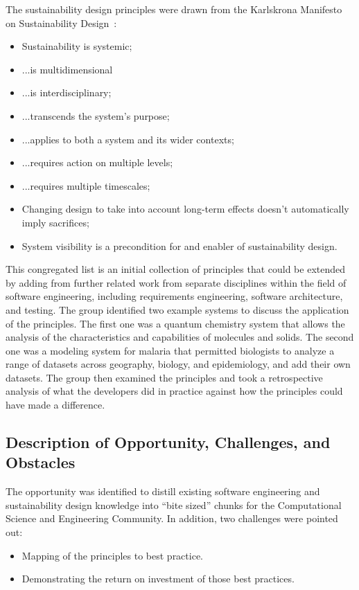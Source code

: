 The sustainability design principles were drawn from the Karlskrona Manifesto on Sustainability Design~\cite{karlskrona,becker2015}:
\begin{itemize}
\item Sustainability is systemic;
\item ...is multidimensional
\item ...is interdisciplinary;
\item ...transcends the system’s purpose;
\item ...applies to both a system and its wider contexts;
\item ...requires action on multiple levels;
\item ...requires multiple timescales;
\item Changing design to take into account long-term effects doesn’t automatically imply sacrifices;
\item System visibility is a precondition for and enabler of sustainability design.
\end{itemize}

This congregated list is an initial collection of principles that could be extended by adding from further related work from separate disciplines within the field of software engineering, including requirements engineering, software architecture, and testing. The group identified two example systems to discuss the application of the principles. The first one was a quantum chemistry system that allows the analysis of the characteristics and capabilities of molecules and solids. The second one was a modeling system for malaria that permitted biologists to analyze a range of datasets across geography, biology, and epidemiology, and add their own datasets. The group then examined the principles and took a retrospective analysis of what the developers did in practice against how the principles could have made a difference. 

\subsection{Description of Opportunity, Challenges, and Obstacles}
The opportunity was identified to distill existing software engineering and sustainability design knowledge into “bite sized” chunks for the Computational Science and Engineering Community. In addition, two challenges were pointed out: 
\begin{itemize}
\item Mapping of the principles to best practice.
\item Demonstrating the return on investment of those best practices.
\end{itemize}

